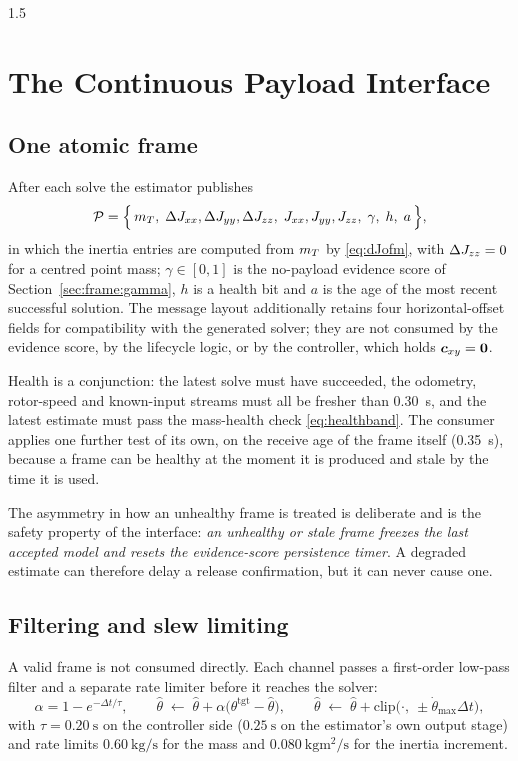 \begin{spacing}{1.5}
\section{The Continuous Payload Interface}\label{sec:frame:interface}

\subsection{One atomic frame}\label{sec:frame:frame}

After each solve the estimator publishes
\begin{equation}
\mathcal{P} = \Bigl\{\, m_T,\;
\Delta J_{xx},\Delta J_{yy},\Delta J_{zz},\; J_{xx},J_{yy},J_{zz},\; \gamma,\; h,\; a \,\Bigr\},
\label{eq:frame}
\end{equation}
in which the inertia entries are computed from $m_T$ by \eqref{eq:dJofm}, with
$\Delta J_{zz}=0$ for a centred point mass; $\gamma\in[0,1]$ is the no-payload
evidence score of Section~\ref{sec:frame:gamma}, $h$ is a health bit and $a$ is the
age of the most recent successful solution. The message layout additionally
retains four horizontal-offset fields for compatibility with the generated
solver; they are not consumed by the evidence score, by the lifecycle logic, or by
the controller, which holds $\bm{c}_{xy}=\bm 0$.

Health is a conjunction: the latest solve must have succeeded, the odometry,
rotor-speed and known-input streams must all be fresher than
\SI{0.30}{\second}, and the latest estimate must pass the mass-health check \eqref{eq:healthband}. The consumer applies one further test of its own, on the
receive age of the frame itself (\SI{0.35}{\second}), because a frame can be
healthy at the moment it is produced and stale by the time it is used.

The asymmetry in how an unhealthy frame is treated is deliberate and is the
safety property of the interface: \emph{an unhealthy or stale frame freezes the
last accepted model and resets the evidence-score persistence timer}. A degraded
estimate can therefore delay a release confirmation, but it can never cause one.

\subsection{Filtering and slew limiting}\label{sec:frame:filter}

A valid frame is not consumed directly. Each channel passes a first-order
low-pass filter and a separate rate limiter before it reaches the solver:
\begin{equation}
\alpha = 1 - e^{-\Delta t/\tau},
\qquad
\hat\theta \;\leftarrow\; \hat\theta + \alpha\bigl(\theta^{\mathrm{tgt}} - \hat\theta\bigr),
\qquad
\hat\theta \;\leftarrow\; \hat\theta + \mathrm{clip}\bigl(\cdot,\ \pm \dot\theta_{\max}\Delta t\bigr),
\label{eq:lpfslew}
\end{equation}
with $\tau=\SI{0.20}{\second}$ on the controller side
($\SI{0.25}{\second}$ on the estimator's own output stage) and rate limits
$\SI{0.60}{\kg\per\second}$ for the mass and
$\SI{0.080}{\kg\meter\squared\per\second}$ for the inertia increment.


\end{spacing}
